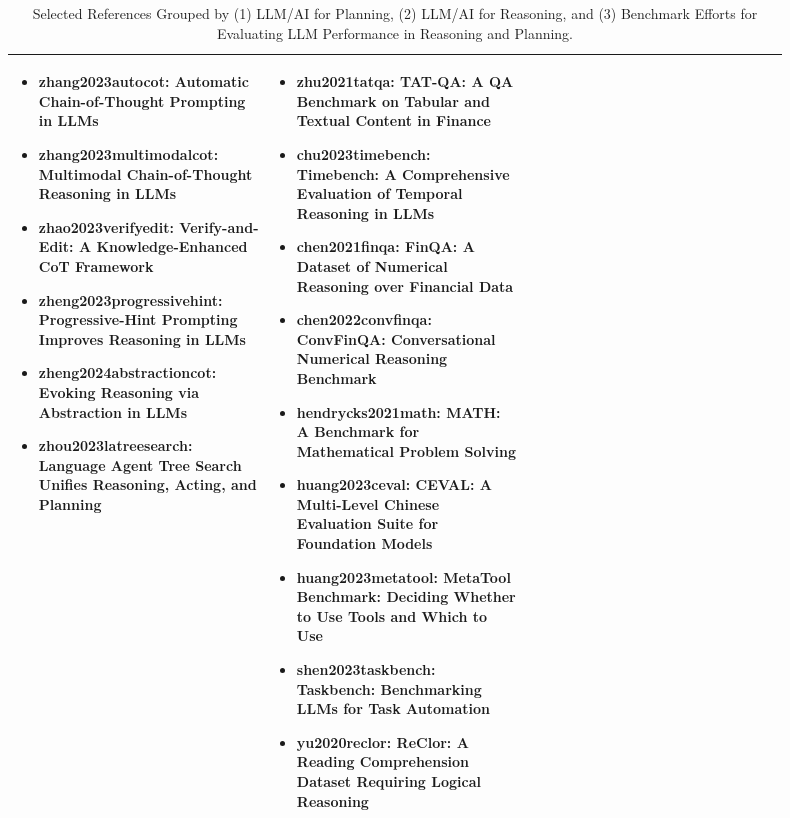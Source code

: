\begin{table}[htbp]
\begin{tabular}{|p{0.3\linewidth}|p{0.3\linewidth}|p{0.3\linewidth}|}
\begin{itemize}[leftmargin=*]
    \item \textbf{zhang2023autocot}: Automatic Chain-of-Thought Prompting in LLMs
    \item \textbf{zhang2023multimodalcot}: Multimodal Chain-of-Thought Reasoning in LLMs
    \item \textbf{zhao2023verifyedit}: Verify-and-Edit: A Knowledge-Enhanced CoT Framework
    \item \textbf{zheng2023progressivehint}: Progressive-Hint Prompting Improves Reasoning in LLMs
    \item \textbf{zheng2024abstractioncot}: Evoking Reasoning via Abstraction in LLMs
    \item \textbf{zhou2023latreesearch}: Language Agent Tree Search Unifies Reasoning, Acting, and Planning
\end{itemize} 
&
\begin{itemize}[leftmargin=*]
    \item \textbf{zhu2021tatqa}: TAT-QA: A QA Benchmark on Tabular and Textual Content in Finance
    \item \textbf{chu2023timebench}: Timebench: A Comprehensive Evaluation of Temporal Reasoning in LLMs
    \item \textbf{chen2021finqa}: FinQA: A Dataset of Numerical Reasoning over Financial Data
    \item \textbf{chen2022convfinqa}: ConvFinQA: Conversational Numerical Reasoning Benchmark
    \item \textbf{hendrycks2021math}: MATH: A Benchmark for Mathematical Problem Solving
    \item \textbf{huang2023ceval}: CEVAL: A Multi-Level Chinese Evaluation Suite for Foundation Models
    \item \textbf{huang2023metatool}: MetaTool Benchmark: Deciding Whether to Use Tools and Which to Use
    \item \textbf{shen2023taskbench}: Taskbench: Benchmarking LLMs for Task Automation
    \item \textbf{yu2020reclor}: ReClor: A Reading Comprehension Dataset Requiring Logical Reasoning
\end{itemize} \\
\hline
\end{tabular}
\caption{Selected References Grouped by (1) LLM/AI for Planning, (2) LLM/AI for Reasoning, and (3) Benchmark Efforts for Evaluating LLM Performance in Reasoning and Planning.}
\label{tab:categories}
\end{table}
